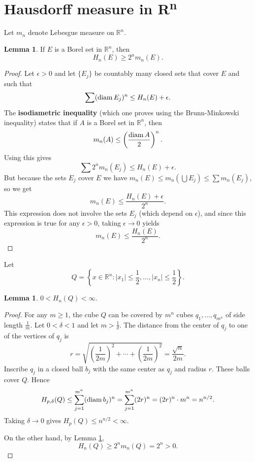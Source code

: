 \documentclass{article}
\newcommand{\diam}{\ensuremath\mathrm{diam}\,}
\theoremstyle{definition}
\newtheorem{lemma}[theorem]{Lemma}
\theoremstyle{definition}
\begin{document}
\section{Hausdorff measure in \textbf{R}\textsuperscript{n}}
Let $m_n$ denote Lebesgue measure on $\mathbb{R}^n$. 

\begin{lemma}
If $E$ is a Borel set in $\mathbb{R}^n$, then
\[
H_n(E) \geq 2^n m_n(E).
\]
\label{Hnmn}
\end{lemma}
\begin{proof}
Let $\epsilon>0$ and let $\{E_j\}$ be countably many closed sets 
that cover $E$ and such that
\[
\sum (\diam E_j)^n \leq H_n(E)+\epsilon.
\]
The \textbf{isodiametric inequality} (which one proves using the Brunn-Minkowski inequality)
states that if $A$ is a Borel set in $\mathbb{R}^n$, then
\[
m_n(A) \leq \left( \frac{\diam A}{2} \right)^n.
\]
Using this gives
\[
\sum 2^n m_n(E_j) \leq H_n(E)+\epsilon.
\]
But
because the sets $E_j$ cover $E$ we have
$m_n(E) \leq m_n(\bigcup E_j) \leq \sum m_n(E_j)$, so we get
\[
m_n(E) \leq \frac{H_n(E)+\epsilon}{2^n}.
\]
This expression does not involve the sets $E_j$ (which depend on $\epsilon$), and since this expression is true for any
$\epsilon>0$, taking $\epsilon \to 0$ yields
\[
m_n(E) \leq \frac{H_n(E)}{2^n}.
\]
\end{proof}


Let
\[
Q=\left\{x \in \mathbb{R}^n: |x_1| \leq \frac{1}{2}, \ldots, |x_n| \leq \frac{1}{2}\right\}.
\]

\begin{lemma}
$0<H_n(Q)<\infty$.
\label{finitemeasure}
\end{lemma}
\begin{proof}
For any $m \geq 1$, the cube $Q$ can be covered by $m^n$ cubes $q_1,\ldots,q_{m^n}$ of side length $\frac{1}{m}$. 
Let $0<\delta<1$ and let $m>\frac{1}{\delta}$. 
The distance from the center of $q_j$ to one of the vertices of $q_j$ is 
\[
r = \sqrt{\left(\frac{1}{2m}\right)^2+\cdots+\left(\frac{1}{2m}\right)^2}
=\frac{\sqrt{n}}{2m}.
\]
Inscribe $q_j$ in a closed ball $b_j$ with the same center as $q_j$ and radius $r$. 
These balls cover $Q$. Hence
\[
H_{p,\delta}(Q) \leq 
\sum_{j=1}^{m^n} (\diam b_j)^n
=\sum_{j=1}^{m^n} (2r)^n
=(2r)^n \cdot m^n
=n^{n/2}.
\]
Taking $\delta \to 0$ gives $H_p(Q) \leq n^{n/2} < \infty$.

On the other hand, by Lemma \ref{Hnmn},
\[
H_n(Q) \geq 2^n m_n(Q) = 2^n>0.
\]
\end{proof}
\end{document}
